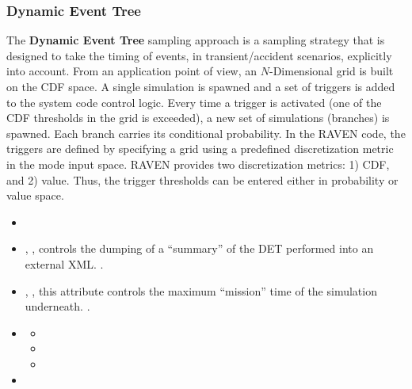 \subsubsection{Dynamic Event Tree}
\label{subsubsubsec:DET}
The \textbf{Dynamic Event Tree} sampling approach is a sampling strategy that is
designed to take the timing of events, in transient/accident scenarios,
explicitly into account.
%
From an application point of view, an $N$-Dimensional grid is built on the CDF
space.
%
A single simulation is spawned and a set of triggers is added to the system code
control logic.
%
Every time a trigger is activated (one of the CDF thresholds in the grid is
exceeded), a new set of simulations (branches) is spawned.
%
Each branch carries its conditional probability.
%
In the RAVEN code, the triggers are defined by specifying a grid using a
predefined discretization metric in the mode input space.
%
RAVEN provides two discretization metrics: 1) CDF, and 2) value.
%
Thus, the trigger thresholds can be entered either in probability or value
space.
%

%
\attrsIntro
\begin{itemize}
  \itemsep0em
  \item \nameDescription
  \item {}, ,
    controls the dumping of a ``summary'' of the DET performed into an external
    XML.
    .
  \item {}, , this
    attribute controls the maximum ``mission'' time of the simulation
    underneath.
    .
\end{itemize}
\begin{itemize}
\item \variableDescription
  \variableChildrenIntro
  \begin{itemize}
    \item \distributionDescription
    \item \functionDescription
    \item \gridDescription
  \end{itemize}
  \item \constantVariablesDescription
\end{itemize}

